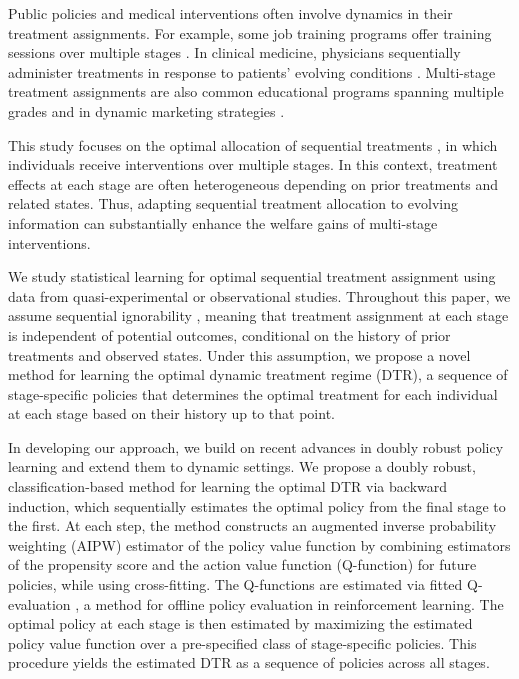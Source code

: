 Public policies and medical interventions often involve dynamics in their treatment assignments. For example, some job training programs offer training sessions over multiple stages \citep[e.g.,][]{Lechner_2009,Rodriguez_et_al_2022}. In clinical medicine, physicians sequentially administer treatments in response to patients’ evolving conditions \citep[e.g.,][]{Wang_et_al_2012,Pelham_et_al_2016}. Multi-stage treatment assignments are also common educational programs spanning multiple grades \citep[e.g.,][]{krueger_1999,Ding_Lehrer_2010} and in dynamic marketing strategies \citep[e.g.,][]{Liu_2023}.

This study focuses on the optimal allocation of sequential treatments \citep{Robins_1986}, in which individuals receive interventions over multiple stages. In this context, treatment effects at each stage are often heterogeneous depending on prior treatments and related states. Thus, adapting sequential treatment allocation to evolving information can substantially enhance the welfare gains of multi-stage interventions.

We study statistical learning for optimal sequential treatment assignment using data from quasi-experimental or observational studies. Throughout this paper, we assume sequential ignorability \citep{Robins_1997}, meaning that treatment assignment at each stage is independent of potential outcomes, conditional on the history of prior treatments and observed states. Under this assumption, we propose a novel method for learning the optimal dynamic treatment regime (DTR), a sequence of stage-specific policies that determines the optimal treatment for each individual at each stage based on their history up to that point.


In developing our approach, we build on recent advances in doubly robust policy learning \citep{Athey_Wager_2020, zhou2022offline} and extend them to dynamic settings. We propose a doubly robust, classification-based method for learning the optimal DTR via backward induction, which sequentially estimates the optimal policy from the final stage to the first. At each step, the method constructs an augmented inverse probability weighting (AIPW) estimator of the policy value function by combining estimators of the propensity score and the action value function (Q-function) for future policies, while using cross-fitting. The Q-functions are estimated via fitted Q-evaluation \citep{Munos_et_al_2008, Fonteneau_et_al_2013, Le_et_al_2019}, a method for offline policy evaluation in reinforcement learning. The optimal policy at each stage is then estimated by maximizing the estimated policy value function over a pre-specified class of stage-specific policies. This procedure yields the estimated DTR as a sequence of policies across all stages.



